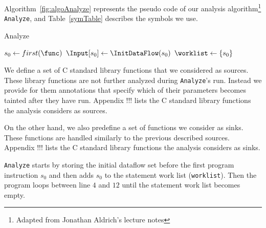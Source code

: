 Algorithm~\ref{fig:algoAnalyze} represents the pseudo code of
our analysis algorithm\footnote{Adapted from Jonathan Aldrich's
lecture notes} \texttt{Analyze}, and Table~\ref{symTable}
describes the symbols we use.

\IncMargin{1em}
\begin{algorithm}
\caption{Analyze}\label{fig:algoAnalyze}
\SetAlgoLined
\LinesNumbered
\DontPrintSemicolon
{}


$ s_0 \leftarrow first(\func)$\;
$\Input[s_0] \leftarrow \InitDataFlow(s_0)$\;
$\worklist \leftarrow \set{s_0}$\;
\While{ $\worklist\ \neq\ \emptyset$ }{
	$\varI \leftarrow \Next(\worklist)$\;
	$\Output[i] \leftarrow \Flow(\AnalyzeAlgo, \varI, \Input[\varI])$\;
	\ForEach{ $\varJ \in \Succs(\varI)$ }{
		\If{ $\Output[\varI] \not\sqsubseteq \Input[\varJ]$}{
			$\Input[\varJ] \leftarrow \Input[\varJ] \sqcup \Output[\varI]$\;
			$\worklist \leftarrow \worklist \cup\ \set{\varJ}$\;
		}	
	}
}
\end{algorithm}
\DecMargin{1em}

We define a set of C standard library functions that
we considered as sources. These library functions are not
further analyzed during \texttt{Analyze}'s run.
Instead we provide for them annotations that specify
which of their parameters becomes tainted after they
have run. Appendix !!! lists the C standard library
functions the analysis considers as sources.

On the other hand, we also predefine a set of functions
we consider as sinks. These functions are handled similarly
to the previous described sources. Appendix !!! lists
the C standard library functions the analysis considers
as sinks.

\texttt{Analyze} starts by storing the initial dataflow
set before the first program instruction $s_0$ and then
adds $s_0$ to the statement work list (\texttt{worklist}).
Then the program loops between line $4$ and $12$ until
the statement work list becomes empty.


